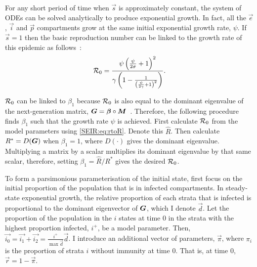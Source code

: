 \documentclass[thesis.tex]{subfiles}
\begin{document}
For any short period of time when $\vec{s}$ is approximately constant, the system of ODEs can be solved analytically to produce exponential growth.
In fact, all the $\vec{e}$, $\vec{i}$ and $\vec{p}$ compartments grow at the same initial exponential growth rate, $\psi$.
If $\vec{s} = 1$ then the basic reproduction number can be linked to the growth rate of this epidemic as follows~\autocites{birrellRealtimea}{wearingAppropriate}:
\begin{align}
    \mathcal{R}_{0} = \frac{\psi \left( \frac{\psi}{2\sigma} + 1 \right)^2}{\gamma \left(1 - \frac{1}{\left(\frac{\psi}{2 \gamma} + 1 \right)^2} \right)} \label{SEIR:eq:rtoR}.
\end{align}

$\mathcal{R}_{0}$ can be linked to $\beta_1$ because $\mathcal{R}_{0}$ is also equal to the dominant eigenvalue of the next-generation matrix, $\bm{G} = \bm\beta \circ \bm{M}$~\autocites{diekmannDefinition}{birrellRealtimea}.
Therefore, the following procedure finds $\beta_1$ such that the growth rate $\psi$ is achieved.
First calculate $\mathcal{R}_{0}$ from the model parameters using \cref{SEIR:eq:rtoR}.
Denote this $\hat{R}$.
Then calculate $R^* = D(\bm{G})$ when $\beta_1=1$, where $D(\cdot)$ gives the dominant eigenvalue.
Multiplying a matrix by a scalar multiplies its dominant eigenvalue by that same scalar, therefore, setting $\beta_1 = \hat{R} / R^*$ gives the desired $\mathcal{R}_{0}$.

To form a parsimonious parameterisation of the initial state, first focus on the initial proportion of the population that is in infected compartments.
In steady-state exponential growth, the relative proportion of each strata that is infected is proportional to the dominant eigenvector of $\bm{G}$, which I denote $\vec{d}$.
Let the proportion of the population in the $i$ states at time 0 in the strata with the highest proportion infected, $i^+$, be a model parameter.
Then, $\vec{i_0} = \vec{i_1} + \vec{i_2} = \frac{i^+}{\max \vec{d}} \vec{d}$.
I introduce an additional vector of parameters, $\vec{\pi}$, where $\pi_i$ is the proportion of strata $i$ without immunity at time 0.
That is, at time 0, $\vec{r} = 1 - \vec{\pi}$.
\end{document}
